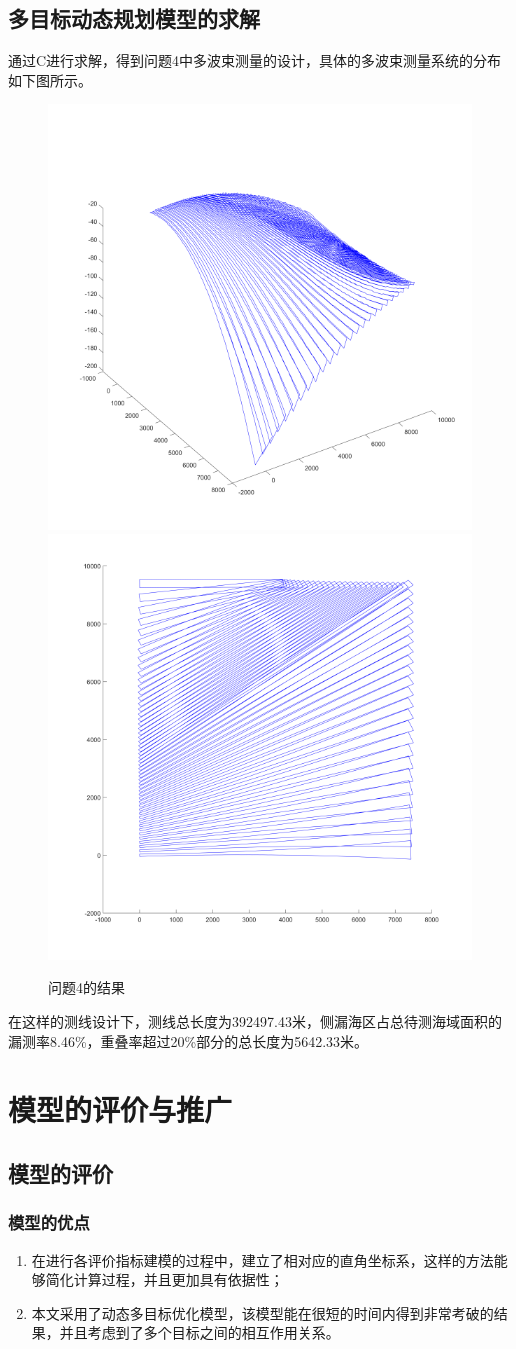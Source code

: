 \documentclass[12pt,a4paper]{article}
\begin{document}
	\subsection{多目标动态规划模型的求解}
	通过C进行求解，得到问题4中多波束测量的设计，具体的多波束测量系统的分布如下图所示。
	\begin{figure}[H]
		\centering
		\includegraphics[width=0.5\linewidth]{media/image61}
		\includegraphics[width=0.4\linewidth]{media/image62}
		\caption{问题4的结果}
		\label{fig6}
	\end{figure}

在这样的测线设计下，测线总长度为392497.43米，侧漏海区占总待测海域面积的漏测率8.46\%，重叠率超过20\%部分的总长度为5642.33米。

\section{模型的评价与推广}
\subsection{模型的评价}
\subsubsection{模型的优点}
\begin{enumerate}
	\item 在进行各评价指标建模的过程中，建立了相对应的直角坐标系，这样的方法能够简化计算过程，并且更加具有依据性；
	\item 本文采用了动态多目标优化模型，该模型能在很短的时间内得到非常考破的结果，并且考虑到了多个目标之间的相互作用关系。
\end{enumerate}
\end{document}
